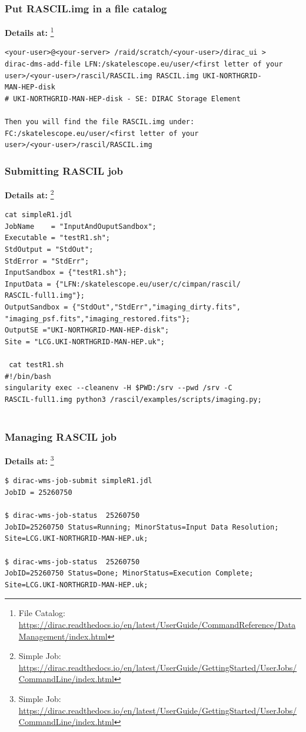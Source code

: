 \documentclass{beamer}
\begin{document}
\begin{frame}[fragile]
\frametitle{ Put RASCIL.img in a file catalog}
\textbf{Details at:} \footnote {File Catalog: \url{https://dirac.readthedocs.io/en/latest/UserGuide/CommandReference/DataManagement/index.html}}
\begin{verbatim}
<your-user>@<your-server> /raid/scratch/<your-user>/dirac_ui > 
dirac-dms-add-file LFN:/skatelescope.eu/user/<first letter of your
user>/<your-user>/rascil/RASCIL.img RASCIL.img UKI-NORTHGRID-
MAN-HEP-disk
# UKI-NORTHGRID-MAN-HEP-disk - SE: DIRAC Storage Element

Then you will find the file RASCIL.img under: 
FC:/skatelescope.eu/user/<first letter of your
user>/<your-user>/rascil/RASCIL.img
\end{verbatim}
\end{frame}



\begin{frame}[fragile]
\frametitle{Submitting RASCIL job}
\textbf{Details at:} \footnote {Simple Job: \url{https://dirac.readthedocs.io/en/latest/UserGuide/GettingStarted/UserJobs/CommandLine/index.html}}
\begin{verbatim}
cat simpleR1.jdl
JobName    = "InputAndOuputSandbox";
Executable = "testR1.sh";
StdOutput = "StdOut";
StdError = "StdErr";
InputSandbox = {"testR1.sh"};
InputData = {"LFN:/skatelescope.eu/user/c/cimpan/rascil/
RASCIL-full1.img"};
OutputSandbox = {"StdOut","StdErr","imaging_dirty.fits",
"imaging_psf.fits","imaging_restored.fits"};
OutputSE ="UKI-NORTHGRID-MAN-HEP-disk";
Site = "LCG.UKI-NORTHGRID-MAN-HEP.uk";

 cat testR1.sh
#!/bin/bash
singularity exec --cleanenv -H $PWD:/srv --pwd /srv -C 
RASCIL-full1.img python3 /rascil/examples/scripts/imaging.py;


\end{verbatim}
\end{frame}


\begin{frame}[fragile]
\frametitle{Managing RASCIL job}
\textbf{Details at:} \footnote {Simple Job: \url{https://dirac.readthedocs.io/en/latest/UserGuide/GettingStarted/UserJobs/CommandLine/index.html}}
\begin{verbatim}
$ dirac-wms-job-submit simpleR1.jdl
JobID = 25260750

$ dirac-wms-job-status  25260750
JobID=25260750 Status=Running; MinorStatus=Input Data Resolution; 
Site=LCG.UKI-NORTHGRID-MAN-HEP.uk;

$ dirac-wms-job-status  25260750
JobID=25260750 Status=Done; MinorStatus=Execution Complete; 
Site=LCG.UKI-NORTHGRID-MAN-HEP.uk;
\end{verbatim}
\end{frame}
\end{document}
